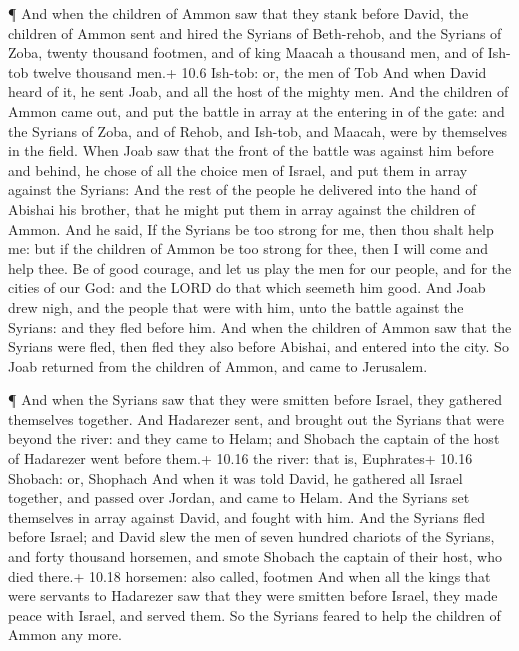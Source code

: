  ¶ And when the children of Ammon saw that they stank before
David, the children of Ammon sent and hired the Syrians of Beth-rehob,
and the Syrians of Zoba, twenty thousand footmen, and of king Maacah a
thousand men, and of Ish-tob twelve thousand men.+ 10.6 Ish-tob: or, the
men of Tob  And when David heard of it, he sent Joab, and
all the host of the mighty men.  And the children of Ammon
came out, and put the battle in array at the entering in of the gate:
and the Syrians of Zoba, and of Rehob, and Ish-tob, and Maacah, were by
themselves in the field.  When Joab saw that the front of
the battle was against him before and behind, he chose of all the choice
men of Israel, and put them in array against the Syrians: 
And the rest of the people he delivered into the hand of Abishai his
brother, that he might put them in array against the children of Ammon.
 And he said, If the Syrians be too strong for me, then
thou shalt help me: but if the children of Ammon be too strong for thee,
then I will come and help thee.  Be of good courage, and
let us play the men for our people, and for the cities of our God: and
the LORD do that which seemeth him good.  And Joab drew
nigh, and the people that were with him, unto the battle against the
Syrians: and they fled before him.  And when the children
of Ammon saw that the Syrians were fled, then fled they also before
Abishai, and entered into the city. So Joab returned from the children
of Ammon, and came to Jerusalem.

 ¶ And when the Syrians saw that they were smitten before
Israel, they gathered themselves together.  And Hadarezer
sent, and brought out the Syrians that were beyond the river: and they
came to Helam; and Shobach the captain of the host of Hadarezer went
before them.+ 10.16 the river: that is, Euphrates+ 10.16 Shobach: or,
Shophach  And when it was told David, he gathered all
Israel together, and passed over Jordan, and came to Helam. And the
Syrians set themselves in array against David, and fought with him.
 And the Syrians fled before Israel; and David slew the men
of seven hundred chariots of the Syrians, and forty thousand horsemen,
and smote Shobach the captain of their host, who died there.+ 10.18
horsemen: also called, footmen  And when all the kings that
were servants to Hadarezer saw that they were smitten before Israel,
they made peace with Israel, and served them. So the Syrians feared to
help the children of Ammon any more.


